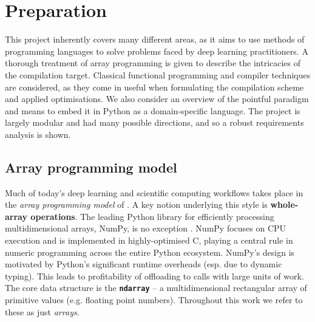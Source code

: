 \chapter{Preparation}

This project inherently covers many different areas, as it aims to use methods of programming languages to solve problems faced by deep learning practitioners. A thorough treatment of array programming is given to describe the intricacies of the compilation target. Classical functional programming and compiler techniques are considered, as they come in useful when formulating the compilation scheme and applied optimisations. We also consider an overview of the pointful paradigm and means to embed it in Python as a domain-specific language. The project is largely modular and had many possible directions, and so a robust requirements analysis is shown.

\section{Array programming model}

Much of today's deep learning and scientific computing workflows takes place in the \textit{array programming model} of \textcite{iverson1962programming}. A key notion underlying this style is \textbf{whole-array operations}. The leading Python library for efficiently processing multidimensional arrays, NumPy, is no exception \cite{harris2020array}. NumPy focuses on CPU execution and is implemented in highly-optimised C, playing a central rule in numeric programming across the entire Python ecosystem. NumPy's design is motivated by Python's significant runtime overheads (esp. due to dynamic typing). This leads to profitability of offloading to calls with large units of work. The core data structure is the \texttt{\textbf{ndarray}} -- a multidimensional rectangular array of primitive values (e.g. floating point numbers). Throughout this work we refer to these as just \textit{arrays}. 

